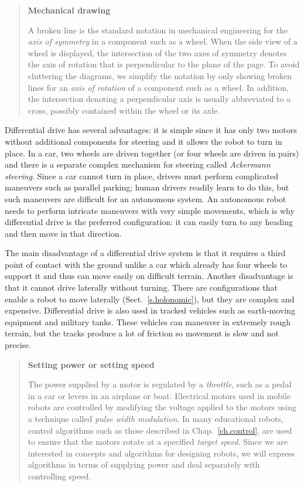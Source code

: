 \begin{quote}
\begin{center}
\textbf{Mechanical drawing}
\end{center}
A broken line is the standard notation in mechanical engineering for the \emph{axis of symmetry} in a component such as a wheel. When the side view of a wheel is displayed, the intersection of the two axes of symmetry denotes the axis of rotation that is perpendicular to the plane of the page. To avoid cluttering the diagrams, we simplify the notation by only showing broken lines for an \emph{axis of rotation} of a component such as a wheel. In addition, the intersection denoting a perpendicular axis is usually abbreviated to a cross, possibly contained within the wheel or its axle.
\end{quote}

Differential drive has several advantages: it is simple since it has only two motors without additional components for steering  and it allows the robot to turn in place. In a car, two wheels are driven together (or four wheels are driven in pairs) and there is a separate complex mechanism for steering called \emph{Ackermann steering}. Since a car cannot turn in place, drivers must perform complicated maneuvers such as parallel parking; human drivers readily learn to do this, but such maneuvers are difficult for an autonomous system. An autonomous robot needs to perform intricate maneuvers with very simple movements, which is why differential drive is the preferred configuration: it can easily turn to any heading and then move in that direction.

The main disadvantage of a differential drive system is that it requires a third point of contact with the ground unlike a car which already has four wheels to support it and thus can move easily on difficult terrain. Another disadvantage is that it cannot drive laterally without turning. There are configurations that enable a robot to move laterally (Sect.~\ref{s.holonomic}), but they are complex and expensive. Differential drive is also used in tracked vehicles such as earth-moving equipment and military tanks. These vehicles can maneuver in extremely rough terrain, but the tracks produce a lot of friction so movement is slow and not precise.

\begin{quote}
\begin{center}
\textbf{Setting power or setting speed}
\end{center}
The power supplied by a motor is regulated by a \emph{throttle}, such as a pedal in a car or levers in an airplane or boat. Electrical motors used in mobile robots are controlled by modifying the voltage applied to the motors using a technique called \emph{pulse width modulation}. In many educational robots, control algorithms such as those described in Chap.~\ref{ch.control}, are used to ensure that the motors rotate at a specified \emph{target speed}. Since we are interested in concepts and algorithms for designing robots, we will express algorithms in terms of supplying power and deal separately with controlling speed.
\end{quote}


